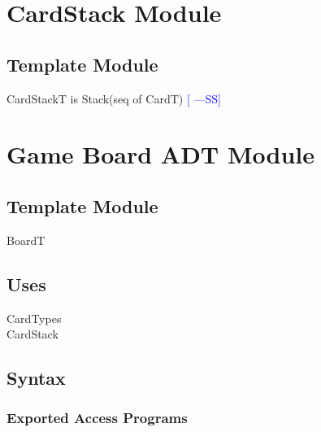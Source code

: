 \documentclass[12pt]{article}
\newcommand{\authornote}[3]{\textcolor{#1}{[#3 ---#2]}}
\newcommand{\authornote}[3]{}
\newcommand{\wss}[1]{\authornote{blue}{SS}{#1}}
\begin{document}
\newpage

\section* {CardStack Module}

\subsection* {Template Module}

CardStackT is Stack(seq of CardT) \wss{}

\newpage

\section* {Game Board ADT Module}

\subsection*{Template Module}

BoardT

\subsection* {Uses}

\noindent CardTypes\\
\noindent CardStack

\subsection* {Syntax}

\subsubsection* {Exported Access Programs}
\end{document}
